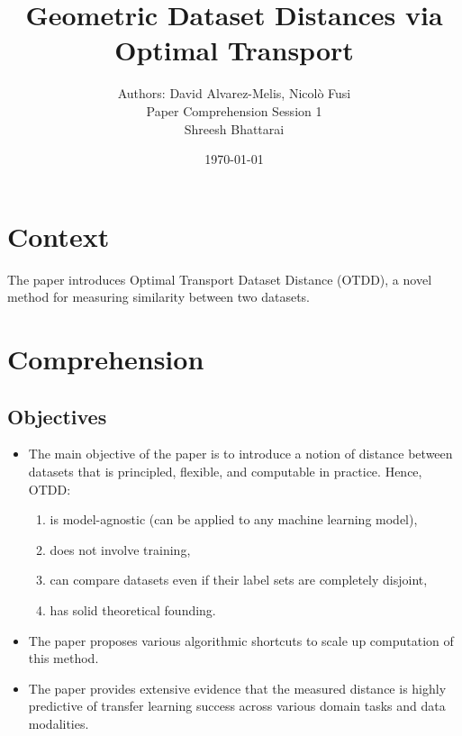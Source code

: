 \documentclass[11pt, a4paper]{article}
\title{Geometric Dataset Distances via Optimal Transport}
\author{Authors: David Alvarez-Melis, Nicolò Fusi\\Paper Comprehension Session 1\\Shreesh Bhattarai}
\date{\today}
\theoremstyle{plain} %
\theoremstyle{definition} %
\begin{document}
	
	\maketitle
	
	\section{Context}
	\label{sec:context}
		The paper introduces Optimal Transport Dataset Distance (OTDD), a novel method for measuring similarity between two datasets.



	\section{Comprehension}
	\label{sec:comprehension}
		\subsection{Objectives}
		\label{sec:objectives}
			\begin{itemize}
				\item The main objective of the paper is to introduce a notion of distance between datasets that is principled, flexible, and computable in practice. Hence, OTDD:
				\begin{enumerate}
					\item is model-agnostic (can be applied to any machine learning model),
					\item does not involve training,
					\item can compare datasets even if their label sets are completely disjoint,
					\item has solid theoretical founding.
				\end{enumerate}
				\item The paper proposes various algorithmic shortcuts to scale up computation of this method.
				\item The paper provides extensive evidence that the measured distance is highly predictive of transfer learning success across various domain tasks and data modalities.
			\end{itemize}
\end{document}
